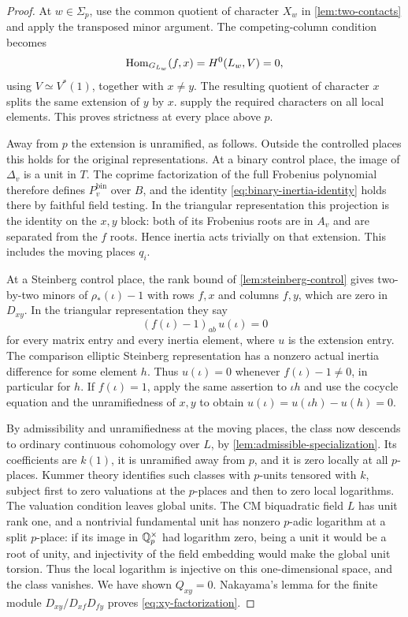 \begin{proof}
At $w\in\Sigma_p$, use the common quotient of character $X_w$ in
\cref{lem:two-contacts} and apply the transposed minor argument.
The competing-column condition becomes
\[
 \operatorname{Hom}_{G_{L_w}}(f,x)=H^0(L_w,V)=0,
\]
using $V\simeq V^*(1)$, together with $x\ne y$.
The resulting quotient of character $x$ splits the same extension
of $y$ by $x$.   supply the required
characters on all local elements.  This proves strictness at every
place above $p$.

Away from $p$ the extension is unramified, as follows.  Outside the
controlled places this holds for the original representations.
At a binary control place, the image of $\Delta_v$ is a unit in $T$.
The coprime factorization of the full Frobenius polynomial therefore
defines $P_v^{\mathrm{bin}}$ over $B$, and the identity
\cref{eq:binary-inertia-identity} holds there by faithful field
testing.  In the triangular representation this projection is the
identity on the $x,y$ block: both of its Frobenius roots are in $A_v$
and are separated from the $f$ roots.  Hence inertia acts trivially
on that extension.  This includes the moving places $q_i$.

At a Steinberg control place, the rank bound of
\cref{lem:steinberg-control} gives two-by-two minors of
$\rho_*(\iota)-1$ with rows $f,x$ and columns $f,y$, which are zero
in $D_{xy}$.  In the triangular representation they say
\[
  (f(\iota)-1)_{ab}\,u(\iota)=0
\]
for every matrix entry and every inertia element, where $u$ is the
extension entry.  The comparison elliptic Steinberg representation
has a nonzero actual inertia difference for some element $h$.
Thus $u(\iota)=0$ whenever $f(\iota)-1\ne0$, in particular for $h$.
If $f(\iota)=1$, apply the same assertion to $\iota h$ and use the
cocycle equation and the unramifiedness of $x,y$ to obtain
$u(\iota)=u(\iota h)-u(h)=0$.

By admissibility and unramifiedness at the moving places, the class
now descends to ordinary continuous cohomology over $L$, by
\cref{lem:admissible-specialization}.  Its coefficients are $k(1)$, it is
unramified away from $p$, and it is zero locally at all $p$-places.
Kummer theory identifies such classes with $p$-units tensored with
$k$, subject first to zero valuations at the $p$-places and then
to zero local logarithms.  The valuation condition leaves global
units.  The CM biquadratic field $L$ has unit rank one, and a
nontrivial fundamental unit has nonzero $p$-adic logarithm at a
split $p$-place: if its image in $\mathbb Q_p^\times$ had logarithm zero,
being a unit it would be a root of unity, and injectivity of the
field embedding would make the global unit torsion.  Thus the
local logarithm is injective on this one-dimensional space, and the
class vanishes.  We have shown $Q_{xy}=0$.  Nakayama's lemma for
the finite module $D_{xy}/D_{xf}D_{fy}$ proves
\cref{eq:xy-factorization}.
\end{proof}

